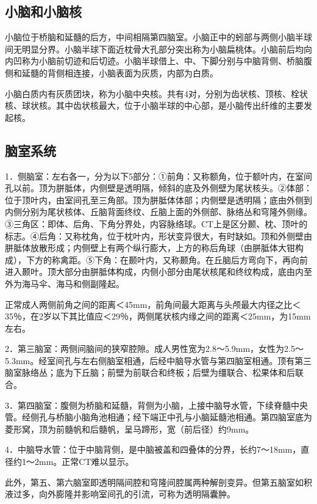 \subsection{小脑和小脑核}

小脑位于桥脑和延髓的后方，中间相隔第四脑室。小脑正中的蚓部与两侧小脑半球间无明显分界。小脑半球下面近枕骨大孔部分突出称为小脑扁桃体。小脑前后均向内凹称为小脑前切迹和后切迹。小脑半球借上、中、下脚分别与中脑背侧、桥脑腹侧和延髓的背侧相连接，小脑表面为灰质，内部为白质。

小脑白质内有灰质团块，称为小脑中央核。共有4对，分别为齿状核、顶核、栓状核、球状核。其中齿状核最大，位于小脑半球的中心部，是小脑传出纤维的主要发起核。

\subsection{脑室系统}

1．侧脑室：左右各一，分为以下5部分：①前角：又称额角，位于额叶内，在室间孔以前。顶为胼胝体，内侧壁是透明隔，倾斜的底及外侧壁为尾状核头。②体部：位于顶叶内，由室间孔至三角部。顶为胼胝体体部；内侧壁是透明隔；底由外侧到内侧分别为尾状核体、丘脑背面终纹、丘脑上面的外侧部、脉络丛和穹隆外侧缘。③三角区：即体、后角、下角分界处，内容脉络球。CT上是区分颞、枕、顶叶的标志。④后角：又称枕角，位于枕叶内，形状变异很大，有时缺如。顶和外侧壁由胼胝体放散形成；内侧壁上有两个纵行膨大，上方的称后角球（由胼胝体大钳构成），下方的称禽距。⑤下角：在颞叶内，又称颞角。在丘脑后方弯向下，再向前进入颞叶。顶大部分由胼胝体构成，内侧小部分由尾状核尾和终纹构成，底由内至外为海马伞、海马和侧副隆起。

正常成人两侧前角之间的距离＜45mm，前角间最大距离与头颅最大内径之比＜35％，在2岁以下其比值应＜29％，两侧尾状核内缘之间的距离＜25mm，为15mm左右。

2．第三脑室：两侧间脑间的狭窄腔隙。成人男性宽为2.8～5.9mm，女性为2.5～5.3mm。经室间孔与左右侧脑室相通，后经中脑导水管与第四脑室相通。顶有第三脑室脉络丛；底为下丘脑；前壁为前联合和终板；后壁为缰联合、松果体和后联合。

3．第四脑室：腹侧为桥脑和延髓，背侧为小脑，上接中脑导水管，下续脊髓中央管。经侧孔与桥脑小脑角池相通；经下端正中孔与小脑延髓池相通。第四脑室底为菱形窝，顶为前髓帆和后髓帆，呈马蹄形，宽（前后径）约9mm。

4．中脑导水管：位于中脑背侧，是中脑被盖和四叠体的分界，长约7～18mm，直径约1～2mm。正常CT难以显示。

此外，第五、第六脑室即透明隔间腔和穹隆间腔属两种解剖变异。但第五脑室如积液过多，向外膨隆并影响室间孔的引流，可称为透明隔囊肿。

